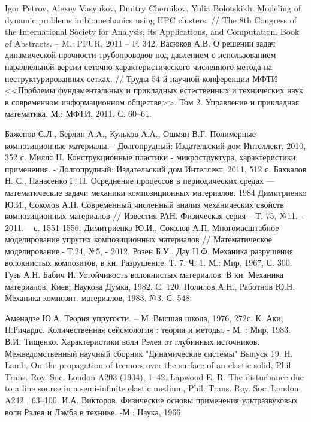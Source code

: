 \begin{thebibliography}{99}
 Igor Petrov, Alexey Vasyukov, Dmitry Chernikov, Yulia Bolotskikh. Modeling of dynamic problems in biomechanics using HPC clusters. // The 8th Congress of the International Society for Analysis, its Applications, and Computation. Book of Abstracts. -- M.: PFUR, 2011 -- P. 342.
 Васюков А.В. О решении задач динамической прочности трубопроводов под давлением с использованием параллельной версии сеточно-характеристического численного метода на неструктурированных сетках. // Труды 54-й научной конференции МФТИ <<Проблемы фундаментальных и прикладных естественных и технических наук в современном информационном обществе>>. Том 2. Управление и прикладная математика. М.: МФТИ, 2011. С. 60--61.

Баженов С.Л., Берлин А.А., Кульков А.А., Ошмян В.Г. Полимерные композиционные материалы. - Долгопрудный: Издательский дом Интеллект, 2010, 352 с.
Миллс Н. Конструкционные пластики - микроструктура, характеристики, применения. - Долгопрудный: Издательский дом Интеллект, 2011, 512 с.
 Бахвалов Н. С., Панасенко Г. П. Осреднение процессов в периодических средах — математические задачи механики композиционных материалов. 1984
Димитриенко Ю.И., Соколов А.П. Современный численный анализ механических свойств композиционных материалов // Известия РАН. Физическая серия – Т. 75, №11. - 2011. – с. 1551-1556. 
Димитриенко Ю.И., Соколов А.П. Многомасштабное моделирование упругих композиционных материалов // Математическое моделирование.- Т.24, №5, - 2012.
Розен Б.У., Дау Н.Ф. Механика разрушения волокнистых композитов, в кн. Разрушение. Т. 7. Ч. 1. М.: Мир, 1967, С. 300.
Гузь А.Н. Бабич И. Устойчивость волокнистых материалов. В кн. Механика материалов. Киев: Наукова Думка, 1982. С. 120.
Полилов А.Н., Работнов Ю.Н. Механика композит. материалов, 1983. №3. С. 548.

Аменадзе Ю.А. Теория упругости. – М.:Высшая школа, 1976, 272с.
К. Аки, П.Ричардс. Количественная сейсмология : теория и методы. - М. : Мир, 1983.
В.И. Тищенко. Характеристики волн Рэлея от глубинных источников. Межведомственный научный сборник "Динамические системы" Выпуск 19.
H. Lamb, On the propagation of tremors over the surface of an elastic solid, Phil. Trans. Roy. Soc. London A203 (1904), 1–42.
Lapwood E. R. The disturbance due to a line source in a semi-infinite elastic medium, Phil. Trans. Roy. Soc. London A242 , 63–100.
И.А. Викторов. Физические основы применения ультразвуковых волн Рэлея и Лэмба в технике. -М.: Наука, 1966.


\end{thebibliography}
